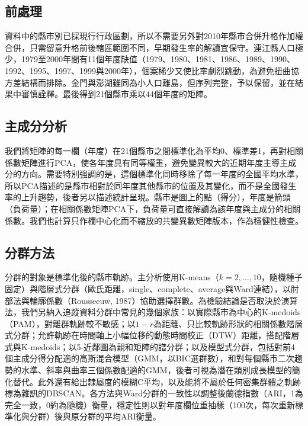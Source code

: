 \documentclass[UTF8,a4paper,11pt]{ctexart}
\begin{document}
\subsection{前處理}
資料中的縣市別已採現行行政區劃，所以不需要另外對2010年縣市合併升格作加權合併，只需留意升格前後轄區範圍不同，早期發生率的解讀宜保守。連江縣人口極少，1979至2000年間有11個年度缺值（1979、1980、1981、1986、1989、1990、1992、1995、1997、1999與2000年），個案稀少又使比率劇烈跳動，為避免扭曲協方差結構而排除。金門與澎湖雖同為小人口離島，但序列完整，予以保留，並在結果中審慎詮釋。最後得到21個縣市乘以44個年度的矩陣。

\subsection{主成分分析}
我們將矩陣的每一欄（年度）在21個縣市之間標準化為平均0、標準差1，再對相關係數矩陣進行PCA，使各年度具有同等權重，避免變異較大的近期年度主導主成分的方向。需要特別強調的是，這個標準化同時移除了每一年度的全國平均水準，所以PCA描述的是縣市相對於同年度其他縣市的位置及其變化，而不是全國發生率的上升趨勢，後者另以描述統計呈現。縣市是圖上的點（得分），年度是箭頭（負荷量）；在相關係數矩陣PCA下，負荷量可直接解讀為該年度與主成分的相關係數。我們也計算只作欄中心化而不縮放的共變異數矩陣版本，作為穩健性檢查。

\subsection{分群方法}
分群的對象是標準化後的縣市軌跡。主分析使用K-means（$k=2,\dots,10$，隨機種子固定）與階層式分群（歐氏距離，single、complete、average與Ward連結），以肘部法與輪廓係數（Rousseeuw, 1987）協助選擇群數。為檢驗結論是否取決於演算法，我們另納入追蹤資料分群中常見的幾個家族：以實際縣市為中心的K-medoids（PAM），對離群軌跡較不敏感；以$1-r$為距離、只比較軌跡形狀的相關係數階層式分群；允許軌跡在時間軸上小幅位移的動態時間校正（DTW）距離，搭配階層式與K-medoids；以5-近鄰圖為親和矩陣的譜分群；以及模型式分群，包括對前4個主成分得分配適的高斯混合模型（GMM，以BIC選群數），和對每個縣市二次趨勢的水準、斜率與曲率三個係數配適的GMM，後者可視為潛在類別成長模型的簡化替代。此外還有給出隸屬度的模糊C平均，以及能將不屬於任何密集群體之軌跡標為雜訊的DBSCAN。各方法與Ward分群的一致性以調整後蘭德指數（ARI，1為完全一致，0約為隨機）衡量，穩定性則以對年度欄位重抽樣（100次，每次重新標準化與分群）後與原分群的平均ARI衡量。
\end{document}

